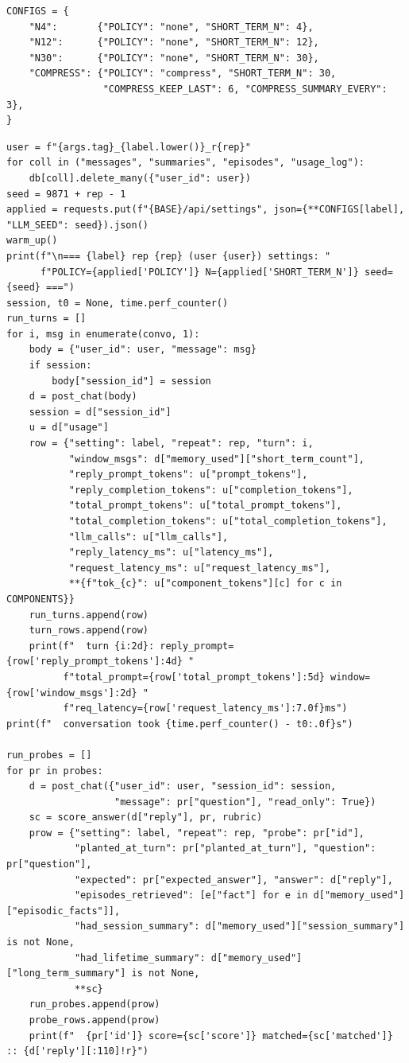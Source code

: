 \documentclass[11pt]{article}
\begin{document}
\begingroup\lstset{basicstyle=\ttfamily\scriptsize}
\begin{lstlisting}
CONFIGS = {
    "N4":       {"POLICY": "none", "SHORT_TERM_N": 4},
    "N12":      {"POLICY": "none", "SHORT_TERM_N": 12},
    "N30":      {"POLICY": "none", "SHORT_TERM_N": 30},
    "COMPRESS": {"POLICY": "compress", "SHORT_TERM_N": 30,
                 "COMPRESS_KEEP_LAST": 6, "COMPRESS_SUMMARY_EVERY": 3},
}
\end{lstlisting}
\endgroup
\begingroup\lstset{basicstyle=\ttfamily\scriptsize}
\begin{lstlisting}
user = f"{args.tag}_{label.lower()}_r{rep}"
for coll in ("messages", "summaries", "episodes", "usage_log"):
    db[coll].delete_many({"user_id": user})
seed = 9871 + rep - 1
applied = requests.put(f"{BASE}/api/settings", json={**CONFIGS[label], "LLM_SEED": seed}).json()
warm_up()
print(f"\n=== {label} rep {rep} (user {user}) settings: "
      f"POLICY={applied['POLICY']} N={applied['SHORT_TERM_N']} seed={seed} ===")
session, t0 = None, time.perf_counter()
run_turns = []
for i, msg in enumerate(convo, 1):
    body = {"user_id": user, "message": msg}
    if session:
        body["session_id"] = session
    d = post_chat(body)
    session = d["session_id"]
    u = d["usage"]
    row = {"setting": label, "repeat": rep, "turn": i,
           "window_msgs": d["memory_used"]["short_term_count"],
           "reply_prompt_tokens": u["prompt_tokens"],
           "reply_completion_tokens": u["completion_tokens"],
           "total_prompt_tokens": u["total_prompt_tokens"],
           "total_completion_tokens": u["total_completion_tokens"],
           "llm_calls": u["llm_calls"],
           "reply_latency_ms": u["latency_ms"],
           "request_latency_ms": u["request_latency_ms"],
           **{f"tok_{c}": u["component_tokens"][c] for c in COMPONENTS}}
    run_turns.append(row)
    turn_rows.append(row)
    print(f"  turn {i:2d}: reply_prompt={row['reply_prompt_tokens']:4d} "
          f"total_prompt={row['total_prompt_tokens']:5d} window={row['window_msgs']:2d} "
          f"req_latency={row['request_latency_ms']:7.0f}ms")
print(f"  conversation took {time.perf_counter() - t0:.0f}s")

run_probes = []
for pr in probes:
    d = post_chat({"user_id": user, "session_id": session,
                   "message": pr["question"], "read_only": True})
    sc = score_answer(d["reply"], pr, rubric)
    prow = {"setting": label, "repeat": rep, "probe": pr["id"],
            "planted_at_turn": pr["planted_at_turn"], "question": pr["question"],
            "expected": pr["expected_answer"], "answer": d["reply"],
            "episodes_retrieved": [e["fact"] for e in d["memory_used"]["episodic_facts"]],
            "had_session_summary": d["memory_used"]["session_summary"] is not None,
            "had_lifetime_summary": d["memory_used"]["long_term_summary"] is not None,
            **sc}
    run_probes.append(prow)
    probe_rows.append(prow)
    print(f"  {pr['id']} score={sc['score']} matched={sc['matched']} :: {d['reply'][:110]!r}")


\end{lstlisting}
\end{document}
